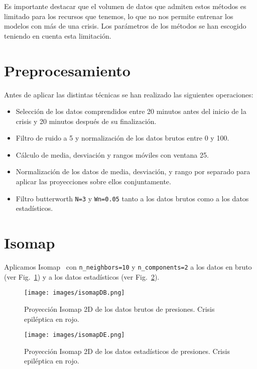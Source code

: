 \documentclass[a4paper,12pt,twoside,oldfontcommands]{memoir}
\begin{document}
	Es importante destacar que el volumen de datos que admiten estos métodos es limitado para los recursos que tenemos, lo que no nos permite entrenar los modelos con más de una crisis. Los parámetros de los métodos se han escogido teniendo en cuenta esta limitación. 
	\section{Preprocesamiento}
	Antes de aplicar las distintas técnicas se han realizado las siguientes operaciones: 
	\begin{itemize}
		\item Selección de los datos comprendidos entre 20 minutos antes del inicio de la crisis y 20 minutos después de su finalización. 
		\item Filtro de ruido a 5 y normalización de los datos brutos entre 0 y 100.
		\item Cálculo de media, desviación y rangos móviles con ventana 25. 
		\item Normalización de los datos de media, desviación, y rango por separado para aplicar las proyecciones sobre ellos conjuntamente. 
		\item Filtro butterworth \texttt{N=3} y \texttt{Wn=0.05} tanto a los datos brutos como a los datos estadísticos.  
	\end{itemize}
	
	\section{Isomap}
	Aplicamos Isomap~\cite{tenenbaum2000global} con \texttt{n\_neighbors=10} y \texttt{n\_components=2} a los datos en bruto (ver Fig.~\ref{fig:isomapDB}) y a los datos estadísticos (ver Fig.~\ref{fig:isomapDE}). 
	\begin{figure}
		\centering
		\texttt{[image: images/isomapDB.png]}
		\caption{Proyección Isomap 2D de los datos brutos de presiones. Crisis epiléptica en rojo.}
		\label{fig:isomapDB}
	\end{figure}
	\begin{figure}
		\centering
		\texttt{[image: images/isomapDE.png]}
		\caption{Proyección Isomap 2D de los datos estadísticos de presiones. Crisis epiléptica en rojo.}
		\label{fig:isomapDE}
	\end{figure}
	
\end{document}
